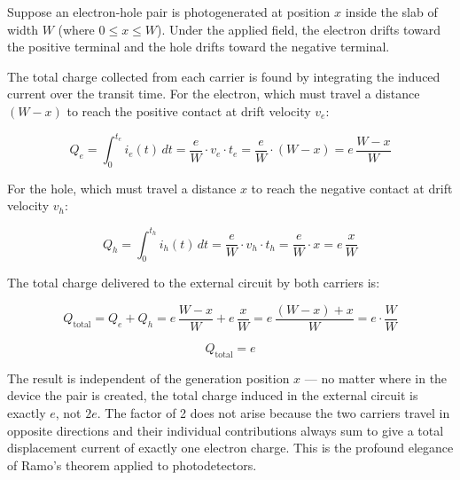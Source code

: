 Suppose an electron-hole pair is photogenerated at position $x$ inside the slab of width $W$ (where $0 \leq x \leq W$). Under the applied field, the electron drifts toward the positive terminal and the hole drifts toward the negative terminal.

The total charge collected from each carrier is found by integrating the induced current over the transit time. For the electron, which must travel a distance $(W - x)$ to reach the positive contact at drift velocity $v_e$:

\begin{equation*}
  Q_e = \int_0^{t_e} i_e(t)\,dt = \frac{e}{W}\cdot v_e \cdot t_e = \frac{e}{W}\cdot(W-x) = e\,\frac{W-x}{W}
\end{equation*}

For the hole, which must travel a distance $x$ to reach the negative contact at drift velocity $v_h$:

\begin{equation*}
  Q_h = \int_0^{t_h} i_h(t)\,dt = \frac{e}{W}\cdot v_h\cdot t_h = \frac{e}{W}\cdot x = e\,\frac{x}{W}
\end{equation*}

The total charge delivered to the external circuit by both carriers is:

\begin{equation*}
  Q_{\text{total}} = Q_e + Q_h = e\,\frac{W-x}{W} + e\,\frac{x}{W} = e\,\frac{(W-x)+x}{W} = e\cdot\frac{W}{W}
\end{equation*}

\begin{equation*}
  \boxed{Q_{\text{total}} = e}
\end{equation*}

The result is independent of the generation position $x$ — no matter where in the device the pair is created, the total charge induced in the external circuit is exactly $e$, not $2e$. The factor of 2 does not arise because the two carriers travel in opposite directions and their individual contributions always sum to give a total displacement current of exactly one electron charge. This is the profound elegance of Ramo's theorem applied to photodetectors.
